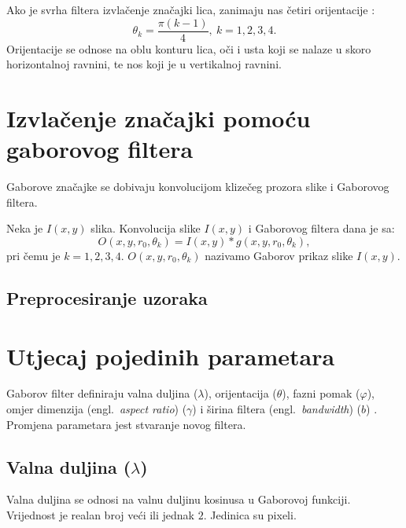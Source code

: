 \documentclass{article}
\newcommand{\engl}[1]{(engl.~\emph{#1})}
\begin{document}
Ako je svrha filtera izvlačenje značajki lica, zanimaju nas četiri orijentacije
\citep{huang2005robust}:
\begin{equation}
\theta_k = \frac{\pi(k-1)}{4},\: k = 1,2,3,4.
\label{equ:orijentacije}
\end{equation}
Orijentacije se odnose na oblu konturu lica, oči i usta koji se nalaze u skoro
horizontalnoj ravnini, te nos koji je u vertikalnoj ravnini.

\section{Izvlačenje značajki pomoću gaborovog filtera}
Gaborove značajke se dobivaju konvolucijom klizečeg prozora slike i Gaborovog
filtera.

Neka je $I(x,y)$ slika. Konvolucija slike $I(x,y)$ i Gaborovog filtera dana je
sa:
\begin{equation}
O(x,y,r_0, \theta_k) = I(x,y) * g(x,y,r_0, \theta_k),
\label{konvolucija-filter-slika}
\end{equation}
pri čemu je $k = 1, 2, 3, 4$. $O(x,y,r_0, \theta_k)$ nazivamo Gaborov prikaz
slike $I(x,y)$.

\subsection{Preprocesiranje uzoraka}

\section{Utjecaj pojedinih parametara}
Gaborov filter definiraju valna duljina ($\lambda$),
orijentacija ($\theta$), fazni pomak ($\varphi$), omjer dimenzija \engl{aspect ratio}
($\gamma $) i širina filtera \engl{bandwidth} ($b$) \citep{petkovgabor}.
Promjena parametara jest stvaranje novog filtera.

\subsection{Valna duljina ($\lambda$)}
Valna duljina se odnosi na valnu duljinu kosinusa u Gaborovoj funkciji.
Vrijednost je realan broj veći ili jednak $2$. Jedinica su pixeli.
\end{document}
